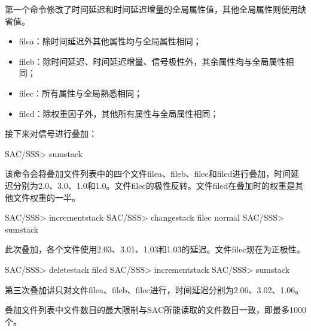第一个命令修改了时间延迟和时间延迟增量的全局属性值，其他全局属性则使用缺省值。
\begin{itemize}
\item filea：除时间延迟外其他属性均与全局属性相同；
\item fileb：除时间延迟、时间延迟增量、信号极性外，其余属性均与全局属性相同；
\item filec：所有属性与全局熟悉相同；
\item filed：除权重因子外，其他所有属性与全局属性相同；
\end{itemize}

接下来对信号进行叠加：
\begin{SACCode}
SAC/SSS> sumstack
\end{SACCode}

该命令会将叠加文件列表中的四个文件filea、fileb、filec和filed进行叠加，时间延迟分别为2.0、3.0、1.0和1.0。文件filec的极性反转。文件filed在叠加时的权重是其他文件权重的一半。

\begin{SACCode}
SAC/SSS> incrementstack
SAC/SSS> changestack filec normal
SAC/SSS> sumstack
\end{SACCode}

此次叠加，各个文件使用2.03、3.01、1.03和1.03的延迟。文件filec现在为正极性。

\begin{SACCode}
SAC/SSS> deletestack filed
SAC/SSS> incrementstack
SAC/SSS> sumstack
\end{SACCode}

第三次叠加讲只对文件filea、fileb、filec进行，时间延迟分别为2.06、3.02、1.06。

叠加文件列表中文件数目的最大限制与SAC所能读取的文件数目一致，即最多1000个。
